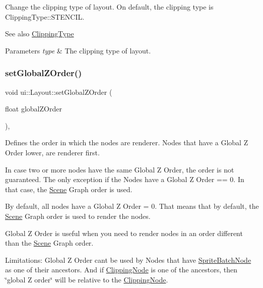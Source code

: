 Change the clipping type of layout. On default, the clipping type is {\ttfamily Clipping\+Type\+::\+S\+T\+E\+N\+C\+IL}. \begin{DoxySeeAlso}{See also}
{\ttfamily \hyperlink{classui_1_1Layout_acd2a398e83d7d467e9565d4db171c865}{Clipping\+Type}} 
\end{DoxySeeAlso}

\begin{DoxyParams}{Parameters}
{\em type} & The clipping type of layout. \\
\hline
\end{DoxyParams}
\mbox{\label{classui_1_1Layout_a5ac5023a3f35c0ba03769ef6794c8537}} 
\subsubsection{\texorpdfstring{set\+Global\+Z\+Order()}{setGlobalZOrder()}}
{\footnotesize\ttfamily void ui\+::\+Layout\+::set\+Global\+Z\+Order (\begin{DoxyParamCaption}\item[{float}]{global\+Z\+Order }\end{DoxyParamCaption})\hspace{0.3cm}{\ttfamily [override]}, {\ttfamily [virtual]}}

Defines the order in which the nodes are renderer. Nodes that have a Global Z Order lower, are renderer first.

In case two or more nodes have the same Global Z Order, the order is not guaranteed. The only exception if the Nodes have a Global Z Order == 0. In that case, the \hyperlink{classScene}{Scene} Graph order is used.

By default, all nodes have a Global Z Order = 0. That means that by default, the \hyperlink{classScene}{Scene} Graph order is used to render the nodes.

Global Z Order is useful when you need to render nodes in an order different than the \hyperlink{classScene}{Scene} Graph order.

Limitations\+: Global Z Order can\textquotesingle{}t be used by Nodes that have \hyperlink{classSpriteBatchNode}{Sprite\+Batch\+Node} as one of their ancestors. And if \hyperlink{classClippingNode}{Clipping\+Node} is one of the ancestors, then \char`\"{}global Z order\char`\"{} will be relative to the \hyperlink{classClippingNode}{Clipping\+Node}.

